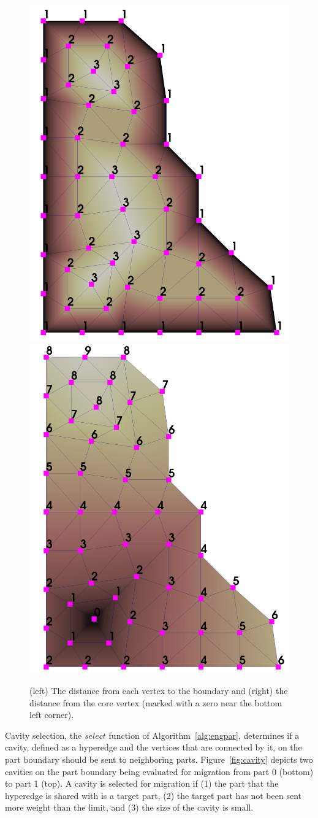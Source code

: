 \documentclass[graybox]{svmult}
\begin{document}
\begin{figure}
  \centering
  \label{fig:distQueue}
  \includegraphics[width=.4\textwidth]{images/2dTreeDepth.png}
  \includegraphics[width=.41\textwidth]{images/2dDistance.png}
  \caption{
    (left) The distance from each vertex to the boundary and (right) the
    distance from the core vertex (marked with a zero near the
    bottom left corner).~\cite{SmithParma2015}
  }
\end{figure}

Cavity selection, the $select$ function of Algorithm~\ref{alg:engpar},
determines if a cavity, defined as a hyperedge and the vertices that are
connected by it, on the part boundary should be sent to neighboring parts.
Figure~\ref{fig:cavity} depicts two cavities on the part boundary being
evaluated for migration from part 0 (bottom) to part 1 (top).
A cavity is selected for migration if (1) the part that the hyperedge is shared
with is a target part, (2) the target part has not been sent more weight than
the limit, and (3) the size of the cavity is small.
\end{document}
